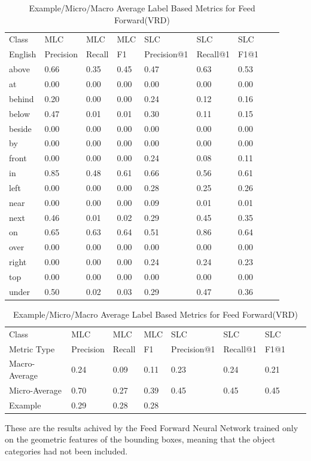 \documentclass{csfyp}
\begin{document}
\begin{table}[!htbp]
\centering
\begin{tabular}{|l|l|l|l|l|l|l|l|l}
\cline{1-7}
Class   &  MLC  &  MLC  &  MLC & SLC &  SLC & SLC \\ \cline{1-7}
English & Precision &  Recall   & F1 & Precision@1 & Recall@1 & F1@1 \\ \cline{1-7} 
above	&	0.66	&	0.35	&	0.45	&	0.47	&	0.63	&	0.53 \\ \cline{1-7} 
at	    &	0.00	&	0.00	&	0.00	&	0.00	&	0.00	&	0.00 \\ \cline{1-7}
behind	&	0.20	&	0.00	&	0.00	&	0.24	&	0.12	&	0.16 \\ \cline{1-7}
below	&	0.47	&	0.01	&	0.01	&	0.30	&	0.11	&	0.15 \\ \cline{1-7} 
beside	&	0.00	&	0.00	&	0.00	&	0.00	&	0.00	&	0.00 \\ \cline{1-7} 
by	    &	0.00	&	0.00	&	0.00	&	0.00	&	0.00	&	0.00 \\ \cline{1-7}
front	&	0.00	&	0.00	&	0.00	&	0.24	&	0.08	&	0.11 \\ \cline{1-7}
in	    &	0.85	&	0.48	&	0.61	&	0.66	&	0.56	&	0.61 \\ \cline{1-7}
left	&	0.00	&	0.00	&	0.00	&	0.28	&	0.25	&	0.26 \\ \cline{1-7}
near	&	0.00	&	0.00	&	0.00	&	0.09	&	0.01	&	0.01 \\ \cline{1-7}
next	&	0.46	&	0.01	&	0.02	&	0.29	&	0.45	&	0.35 \\ \cline{1-7}
on	    &	0.65	&	0.63	&	0.64	&	0.51	&	0.86	&	0.64 \\ \cline{1-7}
over	&	0.00	&	0.00	&	0.00	&	0.00	&	0.00	&	0.00 \\ \cline{1-7}
right	&	0.00	&	0.00	&	0.00	&	0.24	&	0.24	&	0.23 \\ \cline{1-7}
top	    &	0.00	&	0.00	&	0.00	&	0.00	&	0.00	&	0.00 \\ \cline{1-7}
under	&	0.50	&	0.02	&	0.03	&	0.29	&	0.47	&	0.36 \\ \cline{1-7}
\end{tabular}
\caption{Feed Forward(VRD) results for MLC and SLC}
\centering
\begin{tabular}{|l|l|l|l|l|l|l|l|l}
\cline{1-7}
Class &  MLC  &  MLC  &  MLC & SLC &  SLC & SLC \\ \cline{1-7}
Metric Type  & Precision &  Recall & F1 & Precision@1 & Recall@1 & F1@1 \\ \cline{1-7}
Macro-Average &	0.24	&	0.09	&	0.11	&	0.23	&	0.24	&	0.21 \\ \cline{1-7}
Micro-Average &	0.70	&	0.27	&	0.39	&	0.45	&	0.45	&	0.45 \\ \cline{1-7}
Example       &	0.29	&	0.28	&	0.28    \\ \cline{1-4}
\end{tabular}
\caption{Example/Micro/Macro Average Label Based Metrics for Feed Forward(VRD)}
These are the results achived by the Feed Forward Neural Network trained only on the geometric features of the bounding boxes, meaning that the object categories had not been included.
\vspace{-4mm}
\end{table}
\newpage
\end{document}
